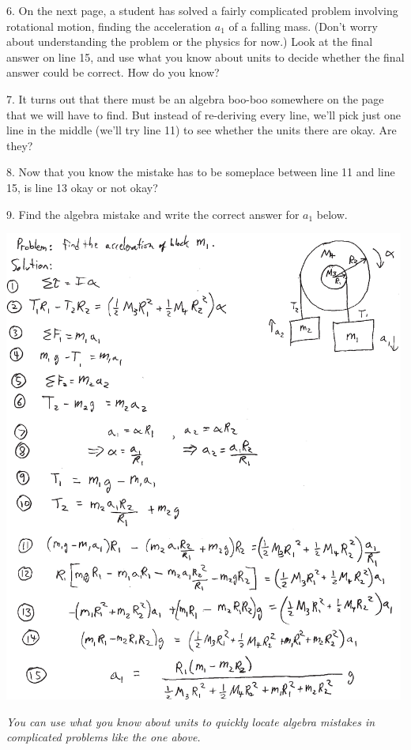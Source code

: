 6. On the next page, a student has solved a fairly complicated problem involving rotational motion, finding the acceleration $a_1$ of a falling mass. (Don't worry about understanding the problem or the physics for now.)  Look at the final answer on line 15, and use what you know about units to decide whether the final answer could be correct.  How do you know?
\vspace{0.7in}

7. It turns out that there must be an algebra boo-boo somewhere on the page that we will have to find.  But instead of re-deriving every line, we'll pick just one line in the middle (we'll try line 11) to see whether the units there are okay.  Are they?
\vspace{0.4in}

8. Now that you know the mistake has to be someplace between line 11 and line 15, is line 13 okay or not okay?
\vspace{0.2in}

9. Find the algebra mistake and write the correct answer for $a_1$ below.
\vspace{0.5in}

\newpage

\begin{center}
\includegraphics[width=0.99\textwidth]{check_your_units/find_the_error_using_units2.eps}
\end{center}

\textit{You can use what you know about units to quickly locate algebra mistakes in complicated problems like the one above.}



